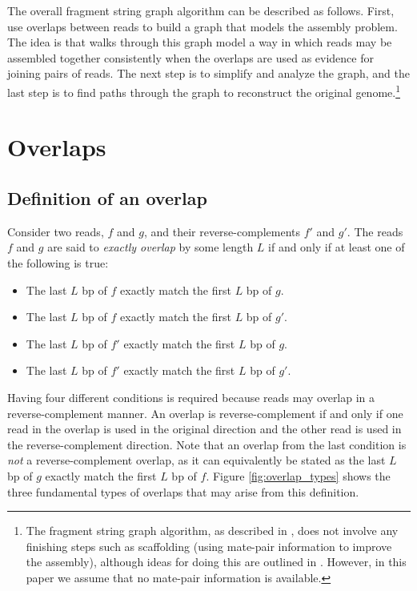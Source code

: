 \documentclass[12pt]{article}
\newcommand{\LengthVar}{L}
\newcommand{\Figure}[1]{Figure \ref{#1}}
\newcommand{\KeyTerm}[1]{{\it #1}}
\begin{document}
The overall fragment string graph algorithm can be described as follows.  First,
use overlaps between reads to build a graph that models the assembly problem.
The idea is that walks through this graph model a way in which reads may be
assembled together consistently when the overlaps are used as evidence for
joining pairs of reads.  The next step is to simplify and analyze the graph, and
the last step is to find paths through the graph to reconstruct the original
genome.\footnote{The fragment string graph algorithm, as described in
\cite{Myers2005}, does not involve any finishing steps such as scaffolding
(using mate-pair information to improve the assembly), although ideas for doing
this are outlined in \cite{Medvedev2009}.  However, in this paper we assume that
no mate-pair information is available.}

\section{Overlaps}

\subsection{Definition of an overlap}
	Consider two reads, $f$ and $g$, and their reverse-complements $f'$ and
	$g'$.  The reads $f$ and $g$ are said to \KeyTerm{exactly overlap} by some
	length $\LengthVar$ if and only if at least one of the following is true:
	\begin{itemize}
		\item The last $\LengthVar$ bp of $f$ exactly match the first
		$\LengthVar$ bp of $g$.
		\item The last $\LengthVar$ bp of $f$ exactly match the first
		$\LengthVar$ bp of $g'$.
		\item The last $\LengthVar$ bp of $f'$ exactly match the first
		$\LengthVar$ bp of $g$.
		\item The last $\LengthVar$ bp of $f'$ exactly match the first
		$\LengthVar$ bp of $g'$.
	\end{itemize}

Having four different conditions is required because reads may overlap in a
reverse-complement manner.  An overlap is reverse-complement if and only if one
read in the overlap is used in the original direction and the other read is used
in the reverse-complement direction.  Note that an overlap from the last
condition is {\em not} a reverse-complement overlap, as it can equivalently be
stated as the last $\LengthVar$ bp of $g$ exactly match the first $\LengthVar$
bp of $f$.  \Figure{fig:overlap_types} shows the three fundamental types of
overlaps that may arise from this definition.
\end{document}
